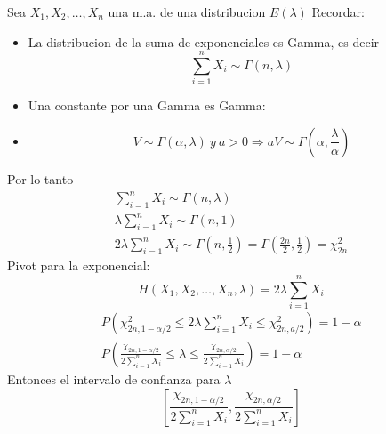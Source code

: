 \documentclass[a4paper]{article}
\begin{document}
Sea $X_1, X_2, \dots, X_n$ una m.a. de una distribucion $E(\lambda)$
Recordar:
\begin{itemize}
    \item La distribucion de la suma de exponenciales es Gamma, es decir
    \begin{equation*}
        \sum_{i=1}^n X_i \sim \Gamma(n, \lambda)
    \end{equation*}
    \item Una constante por una Gamma es Gamma:
    \item \begin{equation*}
        V \sim \Gamma(\alpha, \lambda) \ y \ a > 0 \Rightarrow aV \sim \Gamma(\alpha, \frac{\lambda}{\alpha})
    \end{equation*}
\end{itemize}
Por lo tanto
\begin{gather*}
    \sum_{i=1}^n X_i \sim \Gamma(n, \lambda)
    \\
    \lambda \sum_{i=1}^n X_i \sim \Gamma(n,1)
    \\
    2\lambda \sum_{i=1}^n X_i \sim \Gamma(n, \frac{1}{2}) = \Gamma(\frac{2n}{2}, \frac{1}{2}) = \chi_{2n}^2
\end{gather*}
Pivot para la exponencial:
\begin{equation*}
    H(X_1, X_2, \dots, X_n, \lambda) = 2\lambda \sum_{i=1}^n X_i
\end{equation*}
\begin{gather*}
    P\left(\chi_{2n,1-\alpha /2}^2 \leq 2\lambda \sum_{i=1}^n X_i \leq \chi_{2n,a/2}^2 \right) = 1-\alpha
    \\
    P\left(\frac{\chi_{2n,1-\alpha / 2}}{2\sum_{i=1}^n X_i} \leq \lambda \leq \frac{\chi_{2n,\alpha /2}}{2\sum_{i=1}^n X_i}\right) = 1-\alpha
\end{gather*}
Entonces el intervalo de confianza para $\lambda$
\begin{equation*}
    \left[\frac{\chi_{2n,1-\alpha / 2}}{2\sum_{i=1}^n X_i}, \frac{\chi_{2n,\alpha / 2}}{2\sum_{i=1}^n X_i} \right]
\end{equation*}
\end{document}
